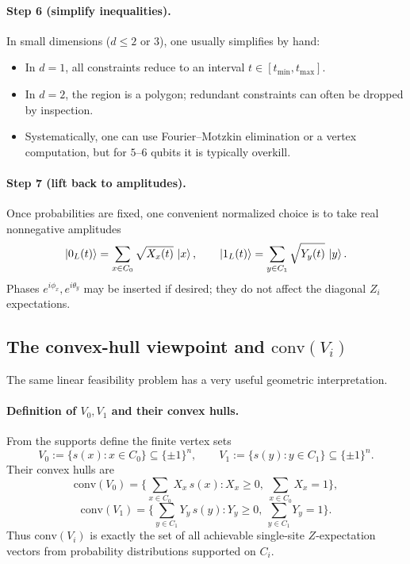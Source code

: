 \documentclass[11pt]{article}
\begin{document}
\paragraph{Step 6 (simplify inequalities).}
In small dimensions ($d\le 2$ or $3$), one usually simplifies by hand:
\begin{itemize}
\item In $d=1$, all constraints reduce to an interval $t\in[t_{\min},t_{\max}]$.
\item In $d=2$, the region is a polygon; redundant constraints can often be dropped by inspection.
\item Systematically, one can use Fourier--Motzkin elimination or a vertex computation, but for $5$--$6$ qubits it is typically overkill.
\end{itemize}

\paragraph{Step 7 (lift back to amplitudes).}
Once probabilities are fixed, one convenient normalized choice is to take real nonnegative amplitudes
\[
\ket{0_L(t)}=\sum_{x\in C_0} \sqrt{X_x(t)}\,\ket{x},\qquad
\ket{1_L(t)}=\sum_{y\in C_1} \sqrt{Y_y(t)}\,\ket{y}.
\]
Phases $e^{i\phi_x},e^{i\theta_y}$ may be inserted if desired; they do not affect the diagonal $Z_i$ expectations.

\subsection{The convex-hull viewpoint and $\mathrm{conv}(V_i)$}
\label{subsec:convVi}

The same linear feasibility problem has a very useful geometric interpretation.

\paragraph{Definition of $V_0,V_1$ and their convex hulls.}
From the supports define the finite vertex sets
\[
V_0:=\{s(x):x\in C_0\}\subseteq\{\pm 1\}^n,\qquad
V_1:=\{s(y):y\in C_1\}\subseteq\{\pm 1\}^n.
\]
Their convex hulls are
\[
\mathrm{conv}(V_0)=\Big\{\sum_{x\in C_0} X_x\,s(x): X_x\ge 0,\ \sum_{x\in C_0}X_x=1\Big\},
\]
\[
\mathrm{conv}(V_1)=\Big\{\sum_{y\in C_1} Y_y\,s(y): Y_y\ge 0,\ \sum_{y\in C_1}Y_y=1\Big\}.
\]
Thus $\mathrm{conv}(V_i)$ is exactly the set of all achievable single-site $Z$-expectation vectors from probability distributions supported on $C_i$.
\end{document}
